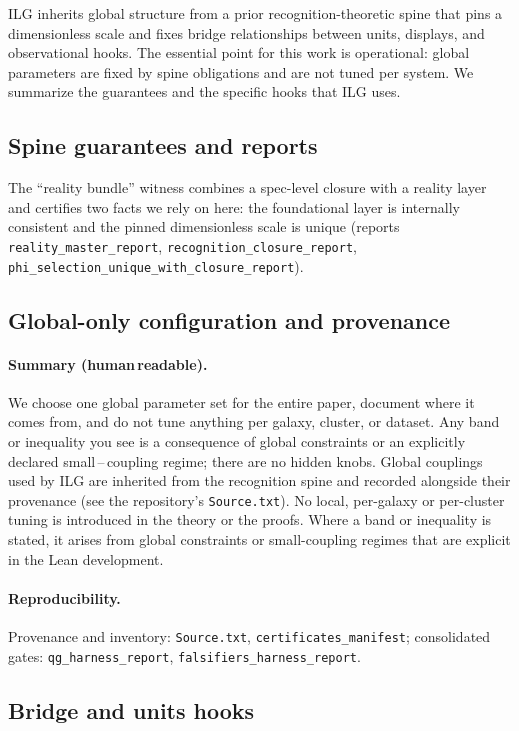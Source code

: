\documentclass[aps,prd,twocolumn,superscriptaddress,nofootinbib,floatfix,longbibliography]{revtex4-2}
\begin{document}
ILG inherits global structure from a prior recognition-theoretic spine that pins a dimensionless scale and fixes bridge relationships between units, displays, and observational hooks. The essential point for this work is operational: global parameters are fixed by spine obligations and are not tuned per system. We summarize the guarantees and the specific hooks that ILG uses.
%
\subsection{Spine guarantees and reports}
The ``reality bundle'' witness combines a spec-level closure with a reality layer and certifies two facts we rely on here: the foundational layer is internally consistent and the pinned dimensionless scale is unique (reports \texttt{reality\_master\_report}, \texttt{recognition\_closure\_report}, \texttt{phi\_selection\_unique\_with\_closure\_report}).
%
\subsection{Global-only configuration and provenance}
\paragraph*{Summary (human\,readable).}
We choose one global parameter set for the entire paper, document where it comes from, and do not tune anything per galaxy, cluster, or dataset. Any band or inequality you see is a consequence of global constraints or an explicitly declared small\,–\,coupling regime; there are no hidden knobs.
Global couplings used by ILG are inherited from the recognition spine and recorded alongside their provenance (see the repository's \texttt{Source.txt}). No local, per-galaxy or per-cluster tuning is introduced in the theory or the proofs. Where a band or inequality is stated, it arises from global constraints or small-coupling regimes that are explicit in the Lean development.
\paragraph*{Reproducibility.}
Provenance and inventory: \texttt{Source.txt}, \texttt{certificates\_manifest}; consolidated gates: \texttt{qg\_harness\_report}, \texttt{falsifiers\_harness\_report}.
%
\subsection{Bridge and units hooks}
\end{document}
